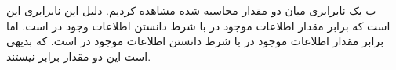 \SubProblem
{ب}
{
یک نابرابری میان دو مقدار محاسبه شده مشاهده کردیم. دلیل این نابرابری این است که 
برابر مقدار اطلاعات موجود در 
با شرط دانستن اطلاعات وجود در
است. اما 
برابر مقدار اطلاعات موجود در 
با شرط دانستن اطلاعات موجود در 
است. که بدیهی است این دو مقدار برابر نیستند.
}